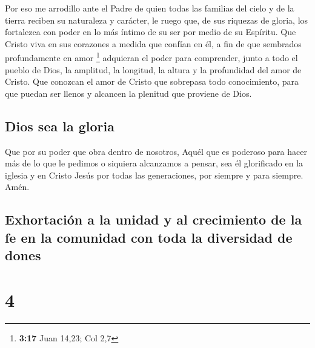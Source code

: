  Por eso me arrodillo ante el Padre  de
quien todas las familias del cielo y de la tierra reciben su naturaleza
y carácter,  le ruego que, de sus riquezas de gloria, los
fortalezca con poder en lo más íntimo de su ser por medio de su
Espíritu.  Que Cristo viva en sus corazones a medida que
confían en él, a fin de que sembrados profundamente en amor \footnote{\textbf{3:17}
  Juan 14,23; Col 2,7}  adquieran el poder para
comprender, junto a todo el pueblo de Dios, la amplitud, la longitud, la
altura y la profundidad del amor de Cristo.  Que conozcan
el amor de Cristo que sobrepasa todo conocimiento, para que puedan ser
llenos y alcancen la plenitud que proviene de Dios.

\hypertarget{dios-sea-la-gloria}{%
\subsection{Dios sea la gloria}\label{dios-sea-la-gloria}}

 Que por su poder que obra dentro de nosotros, Aquél que
es poderoso para hacer más de lo que le pedimos o siquiera alcanzamos a
pensar,  sea él glorificado en la iglesia y en Cristo
Jesús por todas las generaciones, por siempre y para siempre. Amén.

\hypertarget{exhortaciuxf3n-a-la-unidad-y-al-crecimiento-de-la-fe-en-la-comunidad-con-toda-la-diversidad-de-dones}{%
\subsection{Exhortación a la unidad y al crecimiento de la fe en la
comunidad con toda la diversidad de
dones}\label{exhortaciuxf3n-a-la-unidad-y-al-crecimiento-de-la-fe-en-la-comunidad-con-toda-la-diversidad-de-dones}}

\hypertarget{section-3}{%
\section{4}\label{section-3}}


